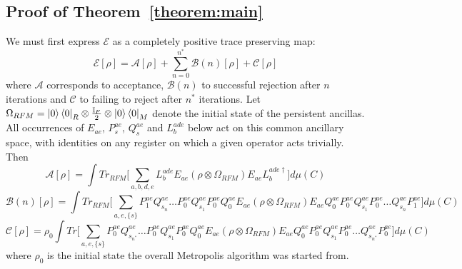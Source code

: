 \subsection{Proof of Theorem~\ref{theorem:main}}
\label{section:proofmain}
We must first express $\mathcal{E}$ as a completely positive trace preserving map:
\begin{equation}
    \mathcal{E}[\rho] = \mathcal{A}[\rho] + \sum_{n=0}^{n^*} \mathcal{B}(n)[\rho] + \mathcal{C}[\rho]
\end{equation}
where $\mathcal{A}$ corresponds to acceptance, $\mathcal{B}(n)$ to successful rejection after $n$ iterations and $\mathcal{C}$ to failing to reject after $n^*$ iterations. Let $\Omega_{RFM} =\ket{0}\bra{0}_R\otimes \frac{\mathbb{I}_F}{2}\otimes\ket{0}\bra{0}_M$ denote the initial state of the persistent ancillas. All occurrences of $E_{ae}$, $P_s^{ae}$, $Q_s^{ae}$ and $L_b^{ade}$ below act on this common ancillary space, with identities on any register on which a given operator acts trivially. Then
\begin{equation}
    \mathcal{A}[\rho] = \int  Tr_{RFM}\bigg[\sum_{a,b,d,e}L_b^{ade} E_{ae} ( \rho\otimes \Omega_{RFM}) 
     E_{ae}L^{ade\dagger}_b\bigg]d\mu(C)
\end{equation}
\begin{equation}
    \mathcal{B}(n)[\rho] = \int Tr_{RFM}\bigg[\sum_{a,e,\{s\}}P^{ae}_1Q^{ae}_{s_n}\ldots P^{ae}_0Q^{ae}_{s_1}P^{ae}_0Q^{ae}_0E_{ae} ( \rho\otimes \Omega_{RFM})E_{ae}Q^{ae}_0P^{ae}_0Q^{ae}_{s_1}P^{ae}_0\ldots Q^{ae}_{s_n}P^{ae}_1\bigg]d\mu(C)
\end{equation}
\begin{equation}
    \mathcal{C}[\rho] = \rho_0 \int Tr\bigg[\sum_{a,e,\{s\}}P^{ae}_0Q^{ae}_{s_{n^*}}\ldots P^{ae}_0Q^{ae}_{s_1}P^{ae}_0Q^{ae}_0E_{ae} ( \rho\otimes \Omega_{RFM})E_{ae}Q^{ae}_0P^{ae}_0Q^{ae}_{s_1}P^{ae}_0\ldots Q^{ae}_{s_{n^*}}P^{ae}_0\bigg]d\mu(C) 
\end{equation}
where $\rho_0$ is the initial state the overall Metropolis algorithm was started from. 
